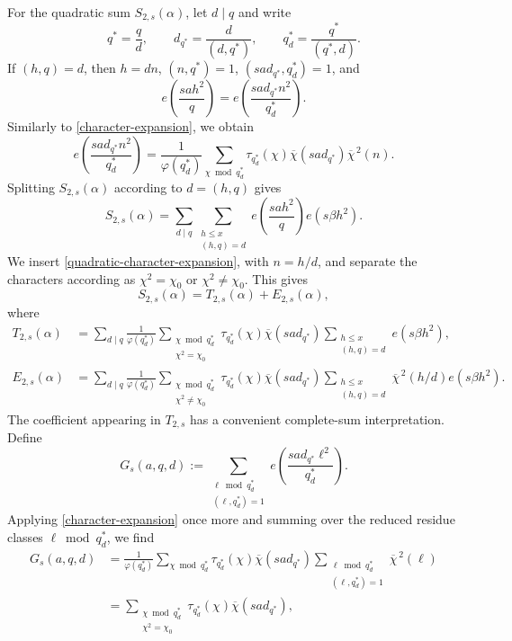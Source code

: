\documentclass[12pt,reqno]{amsart}
\numberwithin{equation}{section}
\theoremstyle{plain}
\theoremstyle{remark}
\begin{document}
For the quadratic sum $S_{2,s}(\alpha)$, let $d\mid q$ and write
\[
 q^*=\frac qd,\qquad
 d_{q^*}=\frac d{(d,q^*)},\qquad q^*_{d}=\frac{q^*}{(q^*,d)}.
\]
If $(h,q)=d$, then $h=dn$, $(n,q^*)=1$, $\left(sa d_{q^*},q^*_{d}\right)=1$, and
\[
 e\left(\frac{sah^2}{q}\right)
 =
 e\left(\frac{sa d_{q^*}n^2}{q^*_{d}}\right).
\]
Similarly to \eqref{character-expansion}, we obtain
\begin{equation}\label{quadratic-character-expansion}
 e\left(\frac{sa d_{q^*}n^2}{q^*_{d}}\right)
 =
 \frac{1}{\varphi(q^*_{d})}
 \sum_{\chi\bmod q^*_{d}}
 \tau_{q^*_{d}}(\chi)
 \overline{\chi}(sa d_{q^*})
 \overline{\chi}^{\,2}(n).
\end{equation}
Splitting $S_{2,s}(\alpha)$ according to $d=(h,q)$ gives
\[
 S_{2,s}(\alpha)
 =
 \sum_{d\mid q}
 \sum_{\substack{h\leq x\\(h,q)=d}}
 e\left(\frac{sah^2}{q}\right)e(s\beta h^2).
\]
We insert \eqref{quadratic-character-expansion}, with $n=h/d$, and
separate the characters according as $\chi^2=\chi_0$ or
$\chi^2\neq\chi_0$.  This gives
\begin{equation}\label{S2-decomposition}
 S_{2,s}(\alpha)
 =
 T_{2,s}(\alpha)+E_{2,s}(\alpha),
\end{equation}
where
\begin{align}
 T_{2,s}(\alpha)
 &=
 \sum_{d\mid q}\frac{1}{\varphi(q^*_{d})}
 \sum_{\substack{\chi\bmod q^*_{d}\\\chi^2=\chi_0}}
 \tau_{q^*_{d}}(\chi)
 \overline{\chi}(sa d_{q^*})
 \sum_{\substack{h\leq x\\(h,q)=d}}
 e(s\beta h^2),
 \label{T2-definition}\\
 E_{2,s}(\alpha)
 &=
 \sum_{d\mid q}\frac{1}{\varphi(q^*_{d})}
 \sum_{\substack{\chi\bmod q^*_{d}\\\chi^2\neq\chi_0}}
 \tau_{q^*_{d}}(\chi)
 \overline{\chi}(sa d_{q^*})
 \sum_{\substack{h\leq x\\(h,q)=d}}
 \overline{\chi}^{\,2}(h/d)e(s\beta h^2).
 \label{E2-definition}
\end{align}
The coefficient appearing in $T_{2,s}$ has a convenient
complete-sum interpretation.  Define
\[
 G_s(a,q,d)
 :=
 \sum_{\substack{\ell\bmod q^*_{d}\\(\ell,q^*_{d})=1}}
 e\left(\frac{sa d_{q^*}\ell^2}{q^*_{d}}\right).
\]
Applying \eqref{character-expansion} once more and summing
over the reduced residue classes $\ell\bmod q^*_{d}$, we find
\begin{align*}
 G_s(a,q,d)
 &=
 \frac{1}{\varphi(q^*_{d})}
 \sum_{\chi\bmod q^*_{d}}
 \tau_{q^*_{d}}(\chi)
 \overline{\chi}(sa d_{q^*})
 \sum_{\substack{\ell\bmod q^*_{d}\\(\ell,q^*_{d})=1}}
 \overline{\chi}^{\,2}(\ell)\\
 &=
 \sum_{\substack{\chi\bmod q^*_{d}\\\chi^2=\chi_0}}
 \tau_{q^*_{d}}(\chi)
 \overline{\chi}(sa d_{q^*}),
\end{align*}
\end{document}
